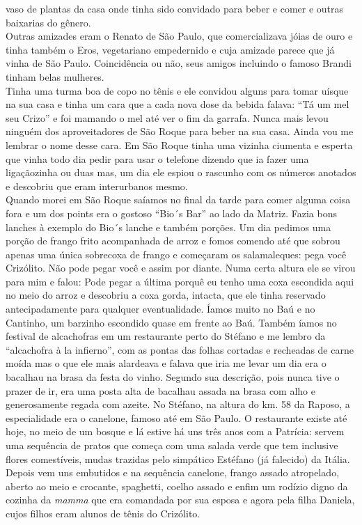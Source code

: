 \documentclass[12pt,brazil,]{book}
\begin{document}
vaso de plantas da casa onde tinha sido convidado para beber e comer e
outras baixarias do gênero.\\
Outras amizades eram o Renato de São Paulo, que comercializava jóias de
ouro e tinha também o Eros, vegetariano empedernido e cuja amizade
parece que já vinha de São Paulo. Coincidência ou não, seus amigos
incluindo o famoso Brandi tinham belas mulheres.\\
Tinha uma turma boa de copo no tênis e ele convidou alguns para tomar
uísque na sua casa e tinha um cara que a cada nova dose da bebida
falava: ``Tá um mel seu Crizo'' e foi mamando o mel até ver o fim da
garrafa. Nunca mais levou ninguém dos aproveitadores de São Roque para
beber na sua casa. Ainda vou me lembrar o nome desse cara. Em São Roque
tinha uma vizinha ciumenta e esperta que vinha todo dia pedir para usar
o telefone dizendo que ia fazer uma ligaçãozinha ou duas mas, um dia ele
espiou o rascunho com os números anotados e descobriu que eram
interurbanos mesmo.\\
Quando morei em São Roque saíamos no final da tarde para comer alguma
coisa fora e um dos points era o gostoso ``Bio´s Bar'' ao lado da
Matriz. Fazia bons lanches à exemplo do Bio´s lanche e também porções.
Um dia pedimos uma porção de frango frito acompanhada de arroz e fomos
comendo até que sobrou apenas uma única sobrecoxa de frango e começaram
os salamaleques: pega você Crizólito. Não pode pegar você e assim por
diante. Numa certa altura ele se virou para mim e falou: Pode pegar a
última porquê eu tenho uma coxa escondida aqui no meio do arroz e
descobriu a coxa gorda, intacta, que ele tinha reservado antecipadamente
para qualquer eventualidade. Íamos muito no Baú e no Cantinho, um
barzinho escondido quase em frente ao Baú. Também íamos no festival de
alcachofras em um restaurante perto do Stéfano e me lembro da
``alcachofra à la infierno'', com as pontas das folhas cortadas e
recheadas de carne moída mas o que ele mais alardeava e falava que iria
me levar um dia era o bacalhau na brasa da festa do vinho. Segundo sua
descrição, pois nunca tive o prazer de ir, era uma posta alta de
bacalhau assada na brasa com alho e generosamente regada com azeite. No
Stéfano, na altura do km. 58 da Raposo, a especialidade era o canelone,
famoso até em São Paulo. O restaurante existe até hoje, no meio de um
bosque e lá estive há uns três anos com a Patrícia: servem uma sequência
de pratos que começa com uma salada verde que tem inclusive flores
comestíveis, mudas trazidas pelo simpático Estéfano (já falecido) da
Itália. Depois vem uns embutidos e na sequência canelone, frango assado
atropelado, aberto ao meio e crocante, spaghetti, coelho assado e enfim
um rodízio digno da cozinha da \emph{mamma} que era comandada por sua
esposa e agora pela filha Daniela, cujos filhos eram alunos de tênis do
Crizólito.
\end{document}
